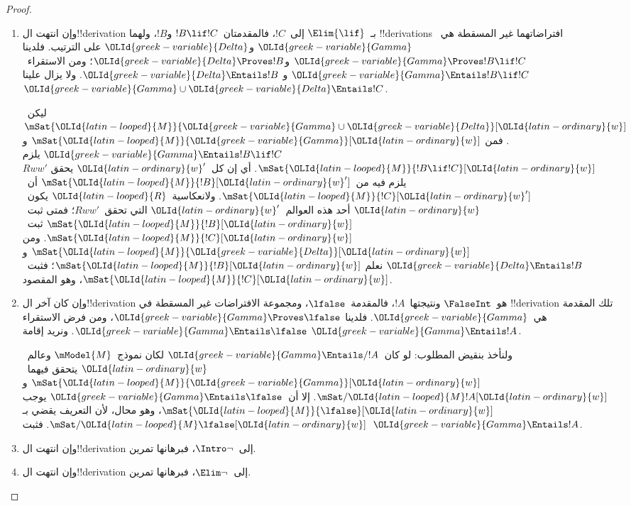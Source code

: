 \documentclass[../../../include/open-logic-section]{subfiles}
\begin{document}
\begin{proof}
\begin{enumerate}
  \item وإن انتهت ال!!{derivation} بـ~$\Elim{\lif}$ إلى~$!C$،
    فالمقدمتان~$!B \lif !C$ و$!B$، ولهما !!{derivation}s افتراضاتهما
    غير المسقطة هي~$\OLId{greek-variable}{Gamma}$ و$\OLId{greek-variable}{Delta}$ على الترتيب. فلدينا
    $\OLId{greek-variable}{Gamma} \Proves !B \lif !C$ و$\OLId{greek-variable}{Delta} \Proves !B$؛ ومن
    الاستقراء~$\OLId{greek-variable}{Gamma} \Entails !B \lif !C$ و
    $\OLId{greek-variable}{Delta} \Entails !B$. ولا يزال علينا
    $\OLId{greek-variable}{Gamma} \cup \OLId{greek-variable}{Delta} \Entails !C$.

    ليكن~$\mSat{\OLId{latin-looped}{M}}{\OLId{greek-variable}{Gamma} \cup \OLId{greek-variable}{Delta}}[\OLId{latin-ordinary}{w}]$. فمن
    $\mSat{\OLId{latin-looped}{M}}{\OLId{greek-variable}{Gamma}}[\OLId{latin-ordinary}{w}]$ و$\OLId{greek-variable}{Gamma} \Entails !B \lif !C$ يلزم
    $\mSat{\OLId{latin-looped}{M}}{!B \lif !C}[\OLId{latin-ordinary}{w}]$. أي إن كل~$\OLId{latin-ordinary}{w}'$ يحقق
    $Rww'$ يلزم فيه من~$\mSat{\OLId{latin-looped}{M}}{!B}[\OLId{latin-ordinary}{w}']$ أن~$\mSat{\OLId{latin-looped}{M}}{!C}[\OLId{latin-ordinary}{w}']$.
    ولانعكاسية~$\OLId{latin-looped}{R}$ يكون~$\OLId{latin-ordinary}{w}$ أحد هذه العوالم~$\OLId{latin-ordinary}{w}'$ التي تحقق~$Rww'$؛
    فمتى ثبت~$\mSat{\OLId{latin-looped}{M}}{!B}[\OLId{latin-ordinary}{w}]$ ثبت~$\mSat{\OLId{latin-looped}{M}}{!C}[\OLId{latin-ordinary}{w}]$. ومن
    $\mSat{\OLId{latin-looped}{M}}{\OLId{greek-variable}{Delta}}[\OLId{latin-ordinary}{w}]$ و$\OLId{greek-variable}{Delta} \Entails !B$ نعلم
    $\mSat{\OLId{latin-looped}{M}}{!B}[\OLId{latin-ordinary}{w}]$؛ فثبت~$\mSat{\OLId{latin-looped}{M}}{!C}[\OLId{latin-ordinary}{w}]$، وهو المقصود.

  \item وإن كان آخر ال!!{derivation} هو~$\FalseInt$ ونتيجتها~$!A$،
    فالمقدمة~$\lfalse$، ومجموعة الافتراضات غير المسقطة في
    !!{derivation} تلك المقدمة هي~$\OLId{greek-variable}{Gamma}$. فلدينا
    $\OLId{greek-variable}{Gamma} \Proves \lfalse$، ومن فرض الاستقراء
    $\OLId{greek-variable}{Gamma} \Entails \lfalse$. ونريد إقامة
    $\OLId{greek-variable}{Gamma} \Entails !A$.

    ولنأخذ بنقيض المطلوب: لو كان~$\OLId{greek-variable}{Gamma} \Entails/ !A$ لكان
    نموذج~$\mModel{M}$ وعالم~$\OLId{latin-ordinary}{w}$ يتحقق فيهما~$\mSat{\OLId{latin-looped}{M}}{\OLId{greek-variable}{Gamma}}[\OLId{latin-ordinary}{w}]$ و
    $\mSat/{\OLId{latin-looped}{M}}{!A}[\OLId{latin-ordinary}{w}]$. إلا أن~$\OLId{greek-variable}{Gamma} \Entails \lfalse$ يوجب
    $\mSat{\OLId{latin-looped}{M}}{\lfalse}[\OLId{latin-ordinary}{w}]$، وهو محال، لأن التعريف يقضي بـ
    $\mSat/{\OLId{latin-looped}{M}}{\lfalse}[\OLId{latin-ordinary}{w}]$. فثبت~$\OLId{greek-variable}{Gamma} \Entails !A$.
  \item وإن انتهت ال!!{derivation} إلى~$\Intro\lnot$، فبرهانها تمرين.
  \item وإن انتهت ال!!{derivation} إلى~$\Elim\lnot$، فبرهانها تمرين.
  \end{enumerate}
\end{proof}
\end{document}

